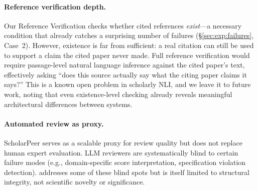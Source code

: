 
\paragraph{Reference verification depth.}
Our Reference Verification checks whether cited references \emph{exist}---a necessary condition that already catches a surprising number of failures (\S\ref{sec:exp:failures}, Case~2).
However, existence is far from sufficient: a real citation can still be used to support a claim the cited paper never made.
Full reference verification would require passage-level natural language inference against the cited paper's text, effectively asking ``does this source actually say what the citing paper claims it says?''
This is a known open problem in scholarly NLI, and we leave it to future work, noting that even existence-level checking already reveals meaningful architectural differences between systems.

\paragraph{Automated review as proxy.}
ScholarPeer serves as a scalable proxy for review quality but does not replace human expert evaluation.
LLM reviewers are systematically blind to certain failure modes (e.g., domain-specific score interpretation, specification violation detection).
\coeaudit{} addresses some of these blind spots but is itself limited to structural integrity, not scientific novelty or significance.

